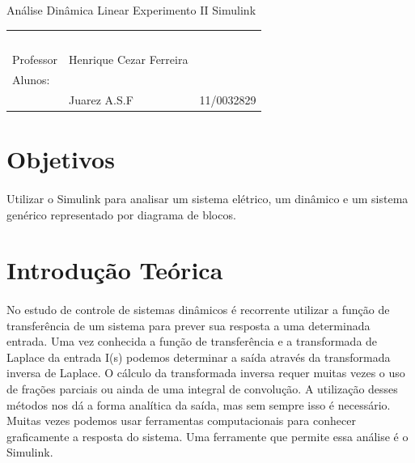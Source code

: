 \documentclass[a4paper,11pt]{article}
\begin{document}
\MakeMyTitlePage
{Análise Dinâmica Linear}
{Experimento II}
{Simulink}
{%
		\begin{tabular}{llr} \
		& & \\[0.05cm]		
		Professor & Henrique Cezar Ferreira & \\
		
		Alunos:& & \\
		& Juarez A.S.F 					& 11/0032829\\
	[0.05cm]	
		\end{tabular}
}

\section{Objetivos}
\paragraph{}Utilizar o Simulink para analisar um sistema elétrico,
um dinâmico e um sistema genérico representado por diagrama de blocos.
\section{Introdução Teórica}
\paragraph{} No estudo de controle de sistemas dinâmicos é recorrente
utilizar a função de transferência de um sistema para prever sua resposta
a uma determinada entrada. Uma vez conhecida a função de transferência 
e a transformada de Laplace da entrada I(s) podemos determinar a saída
através da transformada inversa de Laplace. O cálculo da transformada 
inversa requer muitas vezes o uso de frações parciais ou ainda de uma 
integral de convolução. A utilização desses métodos nos dá a forma
analítica da saída, mas sem sempre isso é necessário. Muitas vezes
podemos usar ferramentas computacionais para conhecer graficamente 
a resposta do sistema. Uma ferramente que permite essa análise é
o Simulink.
\end{document}
